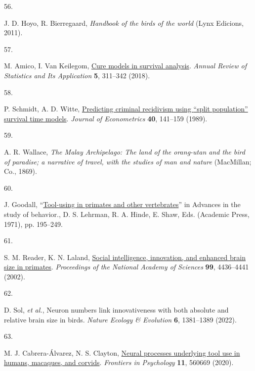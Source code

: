 \documentclass[
  man,floatsintext]{apa6}
\newlength{\cslhangindent}
\newlength{\csllabelwidth}
\newlength{\cslentryspacingunit} %
\newenvironment{CSLReferences}[2] %
 {%
  \setlength{\parindent}{0pt}
  \ifodd #1
  \let\oldpar\par
  \def\par{\hangindent=\cslhangindent\oldpar}
  \fi
  \setlength{\parskip}{#2\cslentryspacingunit}
 }%
 {}
\newcommand{\CSLLeftMargin}[1]{\parbox[t]{\csllabelwidth}{#1}}
\newcommand{\CSLRightInline}[1]{\parbox[t]{\linewidth - \csllabelwidth}{#1}\break}
\begin{document}
\begin{CSLReferences}{0}{0}
\leavevmode{}%
\CSLLeftMargin{56. }%
\CSLRightInline{J. D. Hoyo, R. Bierregaard, \emph{Handbook of the birds of the world} (Lynx Edicions, 2011).}

\leavevmode{}%
\CSLLeftMargin{57. }%
\CSLRightInline{M. Amico, I. Van Keilegom, \href{https://doi.org/10.1146/annurev-statistics-031017-100101}{Cure models in survival analysis}. \emph{Annual Review of Statistics and Its Application} \textbf{5}, 311--342 (2018).}

\leavevmode{}%
\CSLLeftMargin{58. }%
\CSLRightInline{P. Schmidt, A. D. Witte, \href{https://doi.org/10.1016/0304-4076(89)90034-1}{Predicting criminal recidivism using {``split population''} survival time models}. \emph{Journal of Econometrics} \textbf{40}, 141--159 (1989).}

\leavevmode{}%
\CSLLeftMargin{59. }%
\CSLRightInline{A. R. Wallace, \emph{The {M}alay {A}rchipelago: The land of the orang-utan and the bird of paradise; a narrative of travel, with the studies of man and nature} (MacMillan; Co., 1869).}

\leavevmode{}%
\CSLLeftMargin{60. }%
\CSLRightInline{J. Goodall, {``\href{https://doi.org/10.1016/S0065-3454(08)60157-6}{Tool-using in primates and other vertebrates}''} in Advances in the study of behavior., D. S. Lehrman, R. A. Hinde, E. Shaw, Eds. (Academic Press, 1971), pp. 195--249.}

\leavevmode{}%
\CSLLeftMargin{61. }%
\CSLRightInline{S. M. Reader, K. N. Laland, \href{https://doi.org/10.1073/pnas.062041299}{Social intelligence, innovation, and enhanced brain size in primates}. \emph{Proceedings of the National Academy of Sciences} \textbf{99}, 4436--4441 (2002).}

\leavevmode{}%
\CSLLeftMargin{62. }%
\CSLRightInline{D. Sol, \emph{et al.}, Neuron numbers link innovativeness with both absolute and relative brain size in birds. \emph{Nature Ecology \& Evolution} \textbf{6}, 1381--1389 (2022).}

\leavevmode{}%
\CSLLeftMargin{63. }%
\CSLRightInline{M. J. Cabrera-Álvarez, N. S. Clayton, \href{https://doi.org/10.3389/fpsyg.2020.560669}{Neural processes underlying tool use in humans, macaques, and corvids}. \emph{Frontiers in Psychology} \textbf{11}, 560669 (2020).}


\end{CSLReferences}
\end{document}
